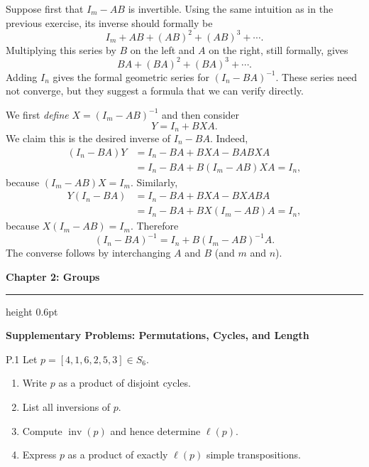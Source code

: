 \documentclass[11pt]{article}
\newcommand{\chapterheading}[1]{%
  \par\vspace{0.5em}
  {\color{courseblue}\Large\bfseries #1}\par\vspace{0.35em}
  {\color{boxborder}\hrule height 0.6pt}\vspace{0.35em}
}
\newcommand{\sectionheading}[1]{%
  \vspace{0.25em}
  {\color{darkgray}\large\bfseries #1}\par
}
\begin{document}
\begin{solution}
Suppose first that $I_m-AB$ is invertible. Using the same intuition as in
the previous exercise, its inverse should formally be
\[
  I_m+AB+(AB)^2+(AB)^3+\cdots.
\]
Multiplying this series by $B$ on the left and $A$ on the right, still
formally, gives
\[
  BA+(BA)^2+(BA)^3+\cdots.
\]
Adding $I_n$ gives the formal geometric series for $(I_n-BA)^{-1}$.
These series need not converge, but they suggest a formula that we can
verify directly.

We first \textit{define}
$X=(I_m-AB)^{-1}$ and then consider
\[
  Y=I_n+BXA.
\]
We claim this is the desired inverse of $I_n-BA$.  Indeed,
\begin{align*}
 (I_n-BA)Y
 &=I_n-BA+BXA-BABXA\\
 &=I_n-BA+B(I_m-AB)XA=I_n,
\end{align*}
because $(I_m-AB)X=I_m$.  Similarly,
\begin{align*}
 Y(I_n-BA)
 &=I_n-BA+BXA-BXABA\\
 &=I_n-BA+BX(I_m-AB)A=I_n,
\end{align*}
because $X(I_m-AB)=I_m$.  Therefore
\[
  (I_n-BA)^{-1}=I_n+B(I_m-AB)^{-1}A.
\]
The converse follows by interchanging $A$ and $B$ (and $m$ and $n$).
\end{solution}

\chapterheading{Chapter 2: Groups}

\sectionheading{Supplementary Problems: Permutations, Cycles, and Length}

\begin{exercise}{P.1}
Let $p=[4,1,6,2,5,3]\in S_6$.
\begin{enumerate}[label=\textbf{(\alph*)}]
  \item Write $p$ as a product of disjoint cycles.
  \item List all inversions of $p$.
  \item Compute $\operatorname{inv}(p)$ and hence determine $\ell(p)$.
  \item Express $p$ as a product of exactly $\ell(p)$ simple transpositions.
\end{enumerate}
\end{exercise}
\end{document}
